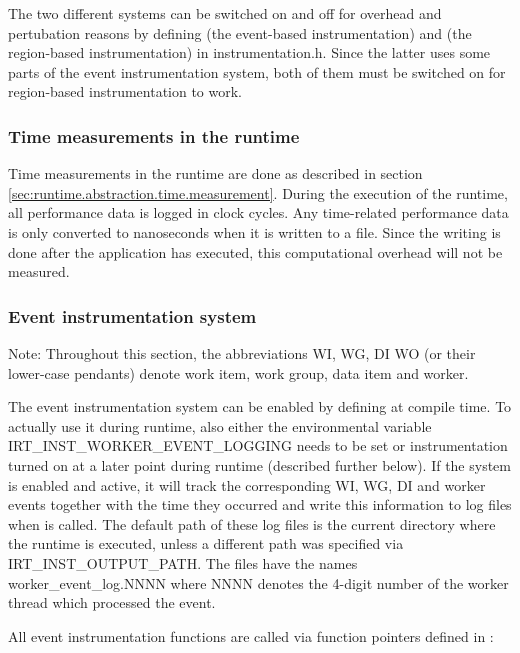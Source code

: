The two different systems can be switched on and off for overhead and
pertubation reasons by defining  (the
event-based instrumentation) and 
(the region-based instrumentation) in instrumentation.h. Since the latter uses
some parts of the event instrumentation system, both of them must be switched on
for region-based instrumentation to work.

\subsubsection{Time measurements in the runtime}

Time measurements in the runtime are done as described in section
\ref{sec:runtime.abstraction.time.measurement}. During the execution of the runtime, all
performance data is logged in clock cycles. Any time-related performance data is
only converted to nanoseconds when it is written to a file. Since the writing is
done after the application has executed, this computational overhead will not be
measured.

\subsubsection{Event instrumentation system}

Note: Throughout this section, the abbreviations WI, WG, DI WO (or their
lower-case pendants) denote work item, work group, data item and worker.

The event instrumentation system can be enabled by defining
 at compile time. To actually use it
during runtime, also either the environmental variable
IRT\_INST\_WORKER\_EVENT\_LOGGING needs to be set or instrumentation turned on
at a later point during runtime (described further below). If the system is
enabled and active, it will track the corresponding WI, WG, DI and worker events
together with the time they occurred and write this information to log files
when  is called. The default path of these log
files is the current directory where the runtime is executed, unless a different
path was specified via IRT\_INST\_OUTPUT\_PATH. The files have the names
worker\_event\_log.NNNN where NNNN denotes the 4-digit number of the worker
thread which processed the event.

All event instrumentation functions are called via function pointers defined in
:

